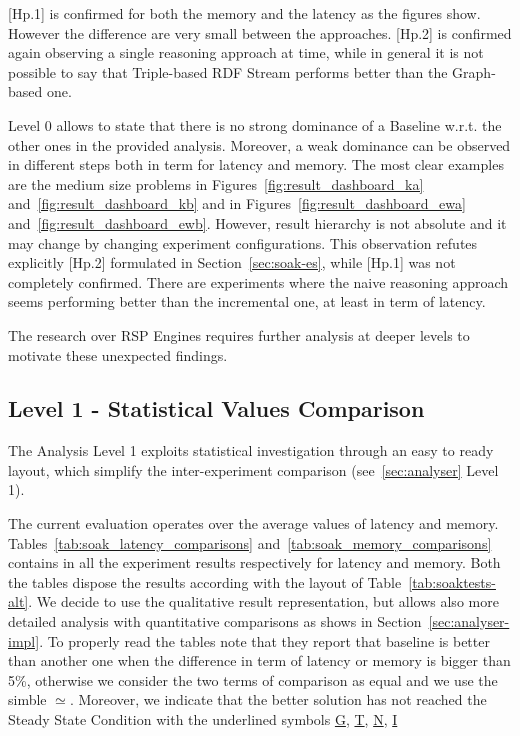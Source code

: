 [Hp.1] is confirmed for both the memory and the latency as the figures show. However the difference are very small between the approaches. [Hp.2] is confirmed again observing a single reasoning approach at time, while in general it is not possible to say that Triple-based RDF Stream performs better than the Graph-based one.

Level 0 allows to state that there is no strong dominance of a Baseline w.r.t. the other ones in the provided analysis. Moreover, a weak dominance can be observed in different steps both in term for latency  and memory. The most clear examples are the medium size problems in Figures~\ref{fig:result_dashboard_ka} and~\ref{fig:result_dashboard_kb} and in Figures~\ref{fig:result_dashboard_ewa} and~\ref{fig:result_dashboard_ewb}. However, result hierarchy is not absolute and it may change by changing experiment configurations. This observation refutes explicitly [Hp.2] formulated in Section~\ref{sec:soak-es}, while [Hp.1] was not completely confirmed. There are experiments where the naive  reasoning  approach seems performing better than the incremental one, at least in term of latency. 

The research over RSP Engines requires further analysis at deeper levels to motivate these unexpected findings.

%


\subsection{Level 1 - Statistical Values Comparison}\label{sec:eval-level1}

The Analysis Level 1 exploits statistical investigation through an easy to ready layout, which simplify the inter-experiment comparison (see~\ref{sec:analyser} Level 1).



The current evaluation operates over the average values of latency and memory. Tables~\ref{tab:soak_latency_comparisons} and~\ref{tab:soak_memory_comparisons} contains in all the experiment results respectively for latency and memory.  Both the tables dispose the results according with the layout of Table~\ref{tab:soaktests-alt}. We decide to use the qualitative result representation, but \name allows also more detailed analysis with quantitative comparisons as shows in Section~\ref{sec:analyser-impl}. To properly read the tables note that they report that baseline is better than another one when the difference in term of latency or memory is bigger than 5\%, otherwise we consider the two terms of comparison as equal and we use the simble $\simeq$.
Moreover, we indicate that the better solution has not reached the Steady State Condition with the underlined symbols \underline{G}, \underline{T}, \underline{N}, \underline{I}

